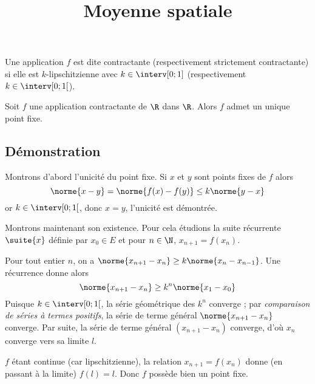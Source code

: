 \documentclass[fontsize=12pt,twoside=false,parskip=half]{scrartcl}
\title{Moyenne spatiale}
\date{}
\author{}
\begin{document}
\maketitle
   Une application $f$ est dite contractante (respectivement strictement contractante) si elle est $k$-lipschitzienne avec
   $k \in \interv[0; 1]$ (respectivement $k \in \interv[0; 1[$).
   \begin{Theoreme}      
      Soit $f$ une application contractante de $\R$ dans $\R$. Alors $f$ admet un unique point fixe.
   \end{Theoreme}
   \subsection{Démonstration}
      Montrons d’abord l’unicité du point fixe. Si $x$ et $y$ sont points fixes de $f$ alors
      \[
         \norme{x - y} = \norme{f(x) - f(y)} \leq k\norme{y - x}          
      \]
      or $k \in \interv[0; 1[$, donc $x = y$, l’unicité est démontrée.
      
      Montrons maintenant son existence. Pour cela étudions la suite récurrente $\suite{x}$ définie par
      $x_0 \in E$ et pour $n \in \N$, $x_{n + 1} = f(x_n)$. 
      
      Pour tout entier $n$, on a $\norme{x_{n + 1} - x_n} \geq k\norme{x_n - x_{n - 1}}$. Une récurrence donne alors
      \[
         \norme{x_{n + 1} - x_n} \geq k^n\norme{x_1 - x_0}
      \]
      Puisque $k \in \interv[0; 1[$, la série géométrique des $k^n$ converge ; par \emph{comparaison de séries à termes 
      positifs}, la série de terme général $\norme{x_{n + 1} - x_n}$ converge. Par suite, la série de terme général 
      $(x_{n + 1} - x_n)$ converge, d’où $x_n$ converge vers sa limite $l$.
      
      $f$ étant continue (car lipschitzienne), la relation $x_{n + 1} = f(x_n)$ donne (en passant à la limite) $f(l) = l$. Donc $f$ possède
      bien un point fixe.
\end{document}
